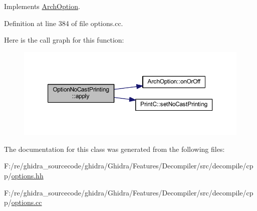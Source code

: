 Implements \mbox{\hyperlink{class_arch_option_a5dc1b3adaee0d11e6018b85640272498}{Arch\+Option}}.



Definition at line 384 of file options.\+cc.

Here is the call graph for this function\+:
\nopagebreak
\begin{figure}[H]
\begin{center}
\leavevmode
\includegraphics[width=350pt]{class_option_no_cast_printing_a75a6992f570f828de4a07eb5a4c73fea_cgraph}
\end{center}
\end{figure}


The documentation for this class was generated from the following files\+:\begin{DoxyCompactItemize}
\item 
F\+:/re/ghidra\+\_\+sourcecode/ghidra/\+Ghidra/\+Features/\+Decompiler/src/decompile/cpp/\mbox{\hyperlink{options_8hh}{options.\+hh}}\item 
F\+:/re/ghidra\+\_\+sourcecode/ghidra/\+Ghidra/\+Features/\+Decompiler/src/decompile/cpp/\mbox{\hyperlink{options_8cc}{options.\+cc}}\end{DoxyCompactItemize}
